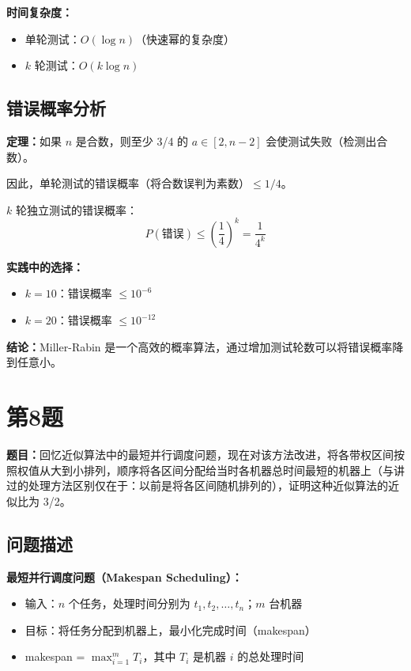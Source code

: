 \documentclass[UTF8,12pt,a4paper]{ctexart}
\begin{document}
\textbf{时间复杂度：}
\begin{itemize}
	\item 单轮测试：$O(\log n)$（快速幂的复杂度）
	\item $k$ 轮测试：$O(k \log n)$
\end{itemize}

\subsection*{错误概率分析}

\textbf{定理：}如果 $n$ 是合数，则至少 3/4 的 $a \in [2, n-2]$ 会使测试失败（检测出合数）。

因此，单轮测试的错误概率（将合数误判为素数）$\leq 1/4$。

$k$ 轮独立测试的错误概率：
$$P(\text{错误}) \leq \left(\frac{1}{4}\right)^k = \frac{1}{4^k}$$

\textbf{实践中的选择：}
\begin{itemize}
	\item $k = 10$：错误概率 $\leq 10^{-6}$
	\item $k = 20$：错误概率 $\leq 10^{-12}$
\end{itemize}

\textbf{结论：}Miller-Rabin 是一个高效的概率算法，通过增加测试轮数可以将错误概率降到任意小。


\section*{第8题}
\textbf{题目：}回忆近似算法中的最短并行调度问题，现在对该方法改进，将各带权区间按照权值从大到小排列，顺序将各区间分配给当时各机器总时间最短的机器上（与讲过的处理方法区别仅在于：以前是将各区间随机排列的），证明这种近似算法的近似比为 3/2。

\subsection*{问题描述}

\textbf{最短并行调度问题（Makespan Scheduling）：}
\begin{itemize}
	\item 输入：$n$ 个任务，处理时间分别为 $t_1, t_2, \ldots, t_n$；$m$ 台机器
	\item 目标：将任务分配到机器上，最小化完成时间（makespan）
	\item makespan = $\max_{i=1}^{m} T_i$，其中 $T_i$ 是机器 $i$ 的总处理时间
\end{itemize}
\end{document}
